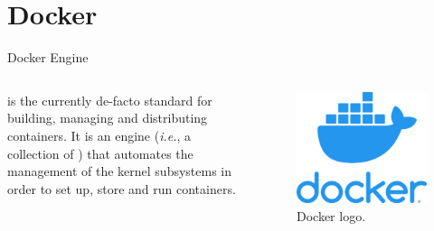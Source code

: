 
\section{Docker}
\graphicspath{{figs/section2/}}

\begin{frame}{Docker Engine}
	\begin{columns}
		 is the currently de-facto standard for building, managing and distributing  containers.
		\newline\newline
		It is an engine (\emph{i.e.}, a collection of ) that automates the management of the kernel subsystems in order to set up, store and run containers.

		\begin{figure}
			\centering
			\label{fig:docker}
			\includegraphics[scale=.2]{docker.png}
			\caption{Docker logo.}
		\end{figure}
	\end{columns}
\end{frame}
